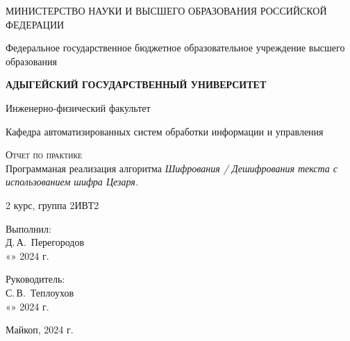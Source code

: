 \documentclass[12pt,a4paper]{scrartcl}
\begin{document}
\begin{titlepage}
		\begin{center}
			\large
			МИНИСТЕРСТВО НАУКИ И ВЫСШЕГО ОБРАЗОВАНИЯ РОССИЙСКОЙ ФЕДЕРАЦИИ
			
			Федеральное государственное бюджетное образовательное учреждение высшего образования
			
			\textbf{АДЫГЕЙСКИЙ ГОСУДАРСТВЕННЫЙ УНИВЕРСИТЕТ}
			\vspace{0.25cm}
			
			Инженерно-физический факультет
			
			Кафедра автоматизированных систем обработки информации и управления
			\vfill

			\vfill
			
			\textsc{Отчет по практике}\\[5mm]
			
			{\LARGE Программаная реализация алгоритма \textit{Шифрования / Дешифрования текста с использованием шифра Цезаря.}}
			\bigskip
			
			2 курс, группа 2ИВТ2
		\end{center}
		\vfill
		
		\newlength{\ML}
		\hfill\begin{minipage}{0.5\textwidth}
			Выполнил:\\
			\underline{\hspace{\ML}} Д.\,А.~Перегородов\\
			«\underline{\hspace{0.7cm}}» \underline{\hspace{2cm}} 2024 г.
		\end{minipage}%
		\bigskip
		
		\hfill\begin{minipage}{0.5\textwidth}
			Руководитель:\\
			\underline{\hspace{\ML}} С.\,В.~Теплоухов\\
			«\underline{\hspace{0.7cm}}» \underline{\hspace{2cm}} 2024 г.
		\end{minipage}%
		\vfill
		
		\begin{center}
			Майкоп, 2024 г.
		\end{center}
  \end{titlepage}
\end{document}
